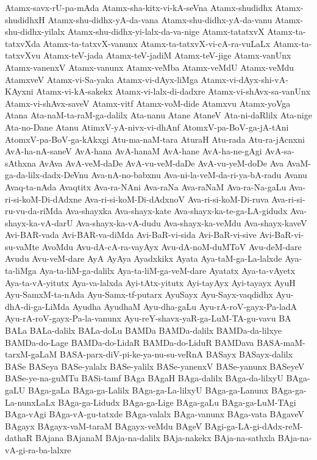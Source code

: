 {Atamx-savx-rU-pa-mAda
Atamx-sha-kitx-vi-kA-seVna
Atamx-shudidhx
Atamx-shudidhxH
Atamx-shu-didhx-yA-da-vana
Atamx-shu-didhx-yA-da-vanu
Atamx-shu-didhx-yilalx
Atamx-shu-didhx-yi-lalx-da-va-nige
Atamx-tatatxvX
Atamx-ta-tatxvXda
Atamx-ta-tatxvX-vanunx
Atamx-ta-tatxvX-vi-cA-ra-vuLaLx
Atamx-ta-tatxvXvu
Atamx-teV-jada
Atamx-teV-jadiM
Atamx-teV-jige
Atamx-vanUnx
Atamx-vanenxV
Atamx-vanunx
Atamx-veMba
Atamx-veMdU
Atamx-veMdu
AtamxveV
Atamx-vi-Sa-yaka
Atamx-vi-dAyx-liMga
Atamx-vi-dAyx-shi-vA-KAyxni
Atamx-vi-kA-sakekx
Atamx-vi-lalx-di-dadxre
Atamx-vi-shAvx-sa-vanUnx
Atamx-vi-shAvx-saveV
Atamx-vitf
Atamx-voM-dide
Atamxvu
Atamx-yoVga
Atana
Ata-naM-ta-raM-ga-dalilx
Ata-nanu
Atane
AtaneV
Ata-ni-daRlilx
Ata-nige
Ata-no-Dane
Atanu
AtimxV-yA-nivx-vi-dhAnf
AtomxV-pa-BoV-ga-jA-tAni
AtomxV-pa-BoV-ga-kAkxgi
Atu-ma-naM-tara
AturaH
Atu-rada
Atu-ra-jAcnxni
AvA-ha-nA-saneV
AvA-hana
AvA-hanaM
AvA-hane
AvA-ha-ne-gAgi
AvA-sa-sAthxna
AvAva
AvA-veM-daDe
AvA-vu-veM-daDe
AvA-vu-yeM-doDe
Ava
AvaM-ga-da-lilx-dadx-DeVnu
Ava-nA-no-babxnu
Ava-ni-la-veM-da-ri-ya-bA-radu
Avanu
Avaq-ta-nAda
Avaqtitx
Ava-ra-NAni
Ava-raNa
Ava-raNaM
Ava-ra-Na-gaLu
Ava-ri-si-koM-Di-dAdxne
Ava-ri-si-koM-Di-dAdxnoV
Ava-ri-si-koM-Di-ruva
Ava-ri-si-ru-vu-da-riMda
Ava-shayxka
Ava-shayx-kate
Ava-shayx-ka-te-ga-LA-gidudx
Ava-shayx-ka-vA-darU
Ava-shayx-ka-vA-dudu
Ava-shayx-ka-veMdu
Ava-shayx-kaveV
Avi-BAR-vada
Avi-BAR-va-diMda
Avi-BaR-vi-sida
Avi-BaR-vi-sive
Avi-BaR-vi-su-vaMte
AvoMdu
Avu-dA-cA-ra-vayAyx
Avu-dA-noM-duMToV
Avu-deM-dare
Avudu
Avu-veM-dare
AyA
AyAya
Ayadxkikx
Ayata
Aya-taM-ga-La-lalxde
Aya-ta-liMga
Aya-ta-liM-ga-dalilx
Aya-ta-liM-ga-veM-dare
Ayatatx
Aya-ta-vAyetx
Aya-ta-vA-yitutx
Aya-va-lalxda
Ayi-tAtx-yitutx
Ayi-tayAyx
Ayi-tayayx
AyuH
Ayu-SamxM-ta-nAda
Ayu-Samx-tf-putarx
AyuSayx
Ayu-Sayx-vaqdidhx
Ayu-dhA-di-ga-LiMda
Ayudha
AyudhaM
Ayu-dha-gaLu
Ayu-rA-roV-gayx-Pa-ladA
Ayu-rA-roV-gayx-Pa-la-vanunx
Ayu-reY-shavx-yaR-ga-LuM-TA-gu-vavu
BA
BALa
BALa-dalilx
BALa-doLu
BAMDa
BAMDa-dalilx
BAMDa-da-lilxye
BAMDa-do-Lage
BAMDa-do-LidaR
BAMDa-do-LiduR
BAMDava
BASA-maM-tarxM-gaLaM
BASA-parx-diV-pi-ke-ya-nu-su-veRnA
BASayx
BASayx-dalilx
BASe
BASeya
BASe-yalalx
BASe-yalilx
BASe-yanenxV
BASe-yanunx
BASeyeV
BASe-ye-na-guMTu
BASi-tamf
BAga
BAgaH
BAga-dalilx
BAga-da-lilxyU
BAga-gaLU
BAga-gaLa
BAga-ga-Lalilx
BAga-ga-La-lilxyU
BAga-ga-Lanunx
BAga-ga-La-nunxLaLx
BAga-ga-Lidudx
BAga-ga-Lige
BAga-gaLu
BAga-ga-LuM-TAgi
BAga-vAgi
BAga-vA-gu-tatxde
BAga-valalx
BAga-vanunx
BAga-vata
BAgaveV
BAgayx
BAgayx-vaM-taraM
BAgayx-veMdu
BAgeV
BAgi-ga-LA-gi-dAdx-reM-dathaR
BAjana
BAjanaM
BAja-na-dalilx
BAja-nakekx
BAja-na-sathxla
BAja-na-vA-gi-ra-ba-lalxre
}
